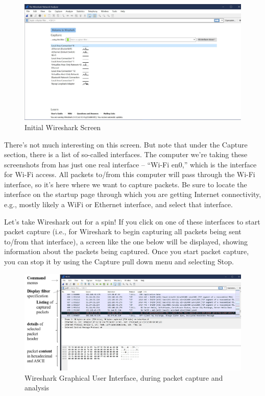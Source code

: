 \documentclass[11pt,a4paper]{article}
\begin{document}
\begin{figure}
    \includegraphics[width=\textwidth]{start_screen.jpg}
    \caption{Initial Wireshark Screen}
\end{figure}

There's not much interesting on this screen. But note that under the Capture section,
there is a list of so-called interfaces. The computer we're taking these screenshots from has just one real interface – “Wi-Fi en0,” which is the interface for Wi-Fi access. All
packets to/from this computer will pass through the Wi-Fi interface, so it's here where we want to capture packets. Be sure to locate the interface on the startup page through which you are getting Internet
connectivity, e.g., mostly likely a WiFi or Ethernet interface, and select that interface.



Let's take Wireshark out for a spin! If you click on one of these interfaces to start packet
capture (i.e., for Wireshark to begin capturing all packets being sent to/from that
interface), a screen like the one below will be displayed, showing information about the
packets being captured. Once you start packet capture, you can stop it by using the
Capture pull down menu and selecting Stop.

\begin{figure}
    \includegraphics[width=\textwidth]{capturing.png}
    \caption{Wireshark Graphical User Interface, during packet capture and analysis}
\end{figure}
\end{document}
